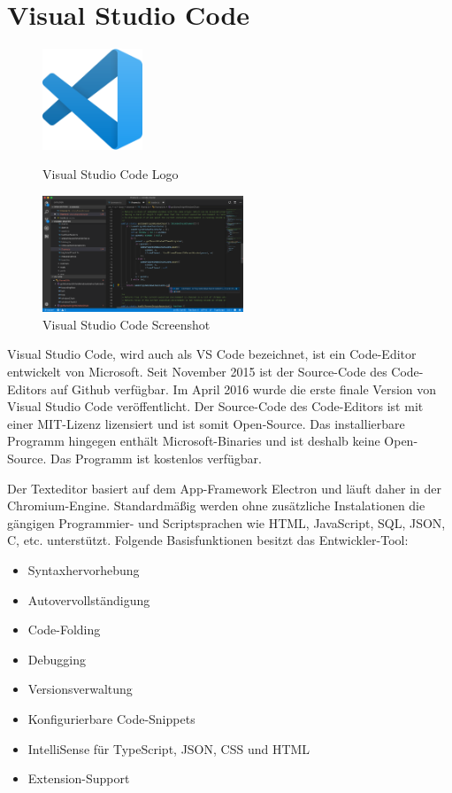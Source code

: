 \section{Visual Studio Code}

\begin{figure}[htb]
    \begin{center}
        \includegraphics[width=3cm] {./pics/Visual_Studio_Code_1.35_icon.svg.png}
        \caption{Visual Studio Code Logo}
        \includegraphics[width=6cm]{./pics/VS_Code_1.36.0-insider.png}
        \caption{Visual Studio Code Screenshot}
    \end{center}
\end{figure}

Visual Studio Code, wird auch als VS Code bezeichnet, ist ein Code-Editor entwickelt von Microsoft. 
Seit November 2015 ist der Source-Code des Code-Editors auf Github verfügbar. Im April 2016 wurde die erste finale Version 
von Visual Studio Code veröffentlicht. Der Source-Code des Code-Editors ist mit einer MIT-Lizenz lizensiert und ist somit Open-Source.
Das installierbare Programm hingegen enthält Microsoft-Binaries und ist deshalb keine Open-Source. Das Programm ist kostenlos verfügbar.

Der Texteditor basiert auf dem App-Framework Electron und läuft daher in der Chromium-Engine. Standardmäßig werden ohne zusätzliche Instalationen
die gängigen Programmier- und Scriptsprachen wie HTML, JavaScript, SQL, JSON, C, etc. unterstützt. 
Folgende Basisfunktionen besitzt das Entwickler-Tool:

\begin{itemize}
    \item Syntaxhervorhebung
    \item Autovervollständigung
    \item Code-Folding %
    \item Debugging
    \item Versionsverwaltung
    \item Konfigurierbare Code-Snippets
    \item IntelliSense für TypeScript, JSON, CSS und HTML
    \item Extension-Support
\end{itemize}

